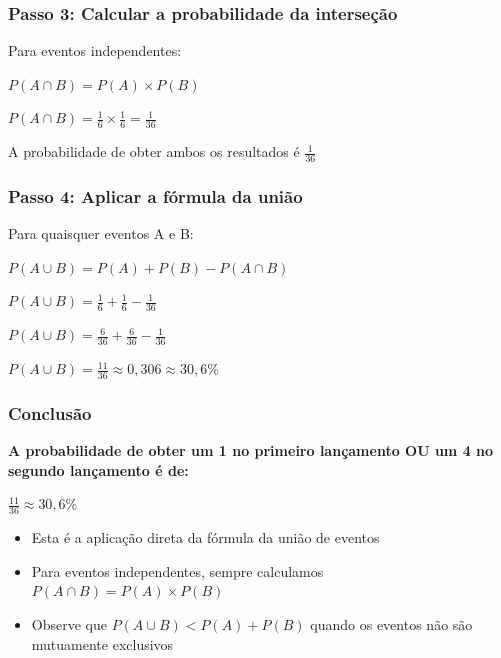 \documentclass[11pt]{beamer}
\begin{document}
\begin{frame}
\frametitle{Passo 3: Calcular a probabilidade da interseção}
\large
Para eventos independentes:

\vspace{0.5cm}
$P(A \cap B) = P(A) \times P(B)$

\vspace{0.5cm}
$P(A \cap B) = \frac{1}{6} \times \frac{1}{6} = \frac{1}{36}$

\vspace{0.5cm}
\begin{center}
A probabilidade de obter ambos os resultados é $\frac{1}{36}$
\end{center}
\end{frame}

\begin{frame}
\frametitle{Passo 4: Aplicar a fórmula da união}
\large
Para quaisquer eventos A e B:

\vspace{0.3cm}
$P(A \cup B) = P(A) + P(B) - P(A \cap B)$

\vspace{0.5cm}
$P(A \cup B) = \frac{1}{6} + \frac{1}{6} - \frac{1}{36}$

\vspace{0.3cm}
$P(A \cup B) = \frac{6}{36} + \frac{6}{36} - \frac{1}{36}$

\vspace{0.3cm}
$P(A \cup B) = \frac{11}{36} \approx 0,306 \approx 30,6\%$
\end{frame}

\begin{frame}
\frametitle{Conclusão}
\large
\begin{center}
\textbf{A probabilidade de obter um 1 no primeiro lançamento OU um 4 no segundo lançamento é de:}

\vspace{0.5cm}
$\frac{11}{36} \approx 30,6\%$
\end{center}

\vspace{0.5cm}
\begin{itemize}
\item Esta é a aplicação direta da fórmula da união de eventos
\item Para eventos independentes, sempre calculamos $P(A \cap B) = P(A) \times P(B)$
\item Observe que $P(A \cup B) < P(A) + P(B)$ quando os eventos não são mutuamente exclusivos
\end{itemize}
\end{frame}
\end{document}
